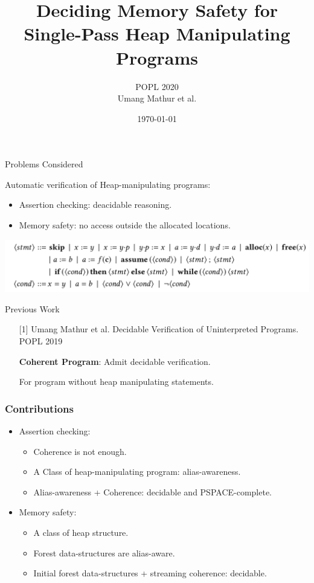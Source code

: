 \documentclass[aspectratio=1610, 13pt]{beamer}
\title{Deciding Memory Safety for Single-Pass Heap Manipulating Programs}
\date{\today}
\author{POPL 2020\\Umang Mathur et al.}
\begin{document}
\maketitle

\begin{frame}{Problems Considered}

Automatic verification of Heap-manipulating programs:

\begin{itemize}
\item Assertion checking:  deacidable reasoning.
\item Memory safety: no access outside the allocated locations. 
\end{itemize}
\begin{center}
\includegraphics[scale=0.28]{program_syntax.png}
\end{center}
\end{frame}

\begin{frame}{Previous Work}

\begin{itemize}
\item [{[1]}] Umang Mathur et al. Decidable Verification of Uninterpreted Programs. POPL 2019

\textbf{Coherent Program}: Admit decidable verification.

For program without heap manipulating statements.
\end{itemize}

\end{frame}


\begin{frame}\frametitle{Contributions}
\begin{itemize}
\item Assertion checking:
\begin{itemize}
\item Coherence is not enough.

\item A Class of heap-manipulating program: alias-awareness.


\item Alias-awareness + Coherence: decidable and PSPACE-complete.

\end{itemize}
\item Memory safety:

\begin{itemize}
\item A class of heap structure.

\item Forest data-structures are alias-aware.

\item Initial forest data-structures + streaming coherence: decidable.
\end{itemize}
\end{itemize}


\end{frame}
\end{document}
